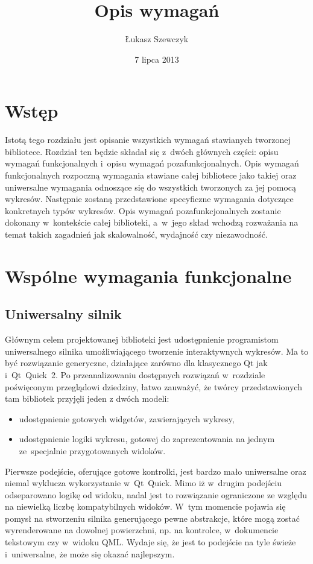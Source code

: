 \documentclass[11pt,twoside,a4paper,final]{article}
\begin{document}
\date{7 lipca 2013}
\title{Opis wymagań}

\author{Łukasz Szewczyk}
\maketitle


\section{Wstęp}
Istotą tego rozdziału jest opisanie wszystkich wymagań stawianych tworzonej bibliotece. 
Rozdział ten będzie składał się z~dwóch głównych części: opisu wymagań funkcjonalnych i~opisu wymagań pozafunkcjonalnych.\newline
Opis wymagań funkcjonalnych rozpoczną wymagania stawiane całej bibliotece jako takiej oraz uniwersalne wymagania odnoszące się do wszystkich tworzonych za jej pomocą wykresów. Następnie zostaną przedstawione specyficzne wymagania dotyczące konkretnych typów wykresów.\newline
Opis wymagań pozafunkcjonalnych zostanie dokonany w~kontekście całej biblioteki, a~w~jego skład wchodzą rozważania na temat takich zagadnień jak skalowalność, wydajność czy niezawodność.

\section{Wspólne wymagania funkcjonalne}
\subsection{Uniwersalny silnik}
Głównym celem projektowanej biblioteki jest udostępnienie programistom uniwersalnego silnika umożliwiającego tworzenie interaktywnych wykresów. Ma to być rozwiązanie generyczne, działające zarówno dla klasycznego Qt jak i~Qt~Quick~2. Po przeanalizowaniu dostępnych rozwiązań w~rozdziale poświęconym przeglądowi dziedziny, łatwo zauważyć, że twórcy przedstawionych tam bibliotek przyjęli jeden z dwóch modeli:
\begin{itemize}
\item{udostępnienie gotowych widgetów, zawierających wykresy,}
\item{udostępnienie logiki wykresu, gotowej do zaprezentowania na jednym ze~specjalnie przygotowanych widoków.}
\end{itemize}
Pierwsze podejście, oferujące gotowe kontrolki, jest bardzo mało uniwersalne oraz niemal wyklucza wykorzystanie w~Qt~Quick.
Mimo iż w~drugim podejściu odseparowano logikę od widoku, nadal jest to rozwiązanie ograniczone ze względu na niewielką liczbę kompatybilnych widoków.
W~tym momencie pojawia się pomysł na stworzeniu silnika generującego pewne abstrakcje, które mogą zostać wyrenderowane na dowolnej powierzchni, np. na kontrolce, w~dokumencie tekstowym czy w~widoku QML. Wydaje się, że jest to podejście na tyle świeże i~uniwersalne, że może się okazać najlepszym.
\end{document}
